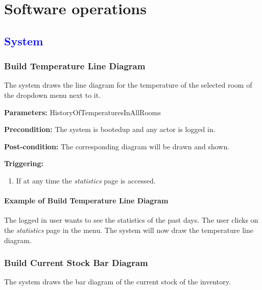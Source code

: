 \chapter{Software operations}
\label{chap:soptware_operations}


\section{\textcolor{blue}{\textbf{System}}}
\subsection{Build Temperature Line Diagram}
\label{operation:BuildTemperatureDiagram}
The system draws the line diagram for the temperature of the selected room of
the dropdown menu next to it.

\begin{description}

\item \textbf{Parameters:} HistoryOfTemperaturesInAllRooms
\item \textbf{Precondition:} The system is bootedup and any actor is logged in.
\item \textbf{Post-condition:} The corresponding diagram will be drawn and
shown.

\item \textbf{Triggering:}
\begin{enumerate}
\item If at any time the \emph{statistics} page is accessed.
\end{enumerate}
\end{description}

\subsubsection{Example of Build Temperature Line Diagram}
The logged in user wants to see the statistics of the past days.
The user clicks on the \emph{statistics} page in the menu.
The system will now draw the temperature line diagram.




\subsection{Build Current Stock Bar Diagram}
\label{operation:BuildCurrentStockDiagram}
The system draws the bar diagram of the current stock of the inventory.

